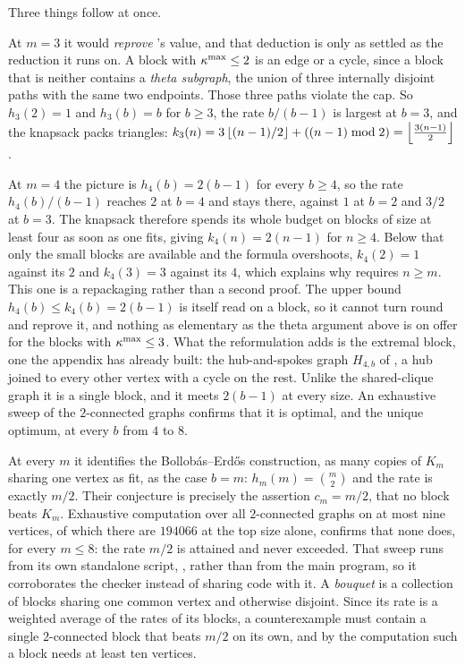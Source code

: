 Three things follow at once.

At $m = 3$ it would \emph{reprove} 's value, and that
deduction is only as settled as the reduction it runs on. A block with
$\kappa^{\max} \le 2$ is an edge or a cycle, since a block that is neither
contains a \emph{theta subgraph}, the union of three internally disjoint paths
with the same two endpoints. Those three paths violate the cap. So
$h_3(2) = 1$ and $h_3(b) = b$ for $b \ge 3$, the rate $b/(b-1)$ is largest at
$b = 3$, and the knapsack packs triangles:
$k_3(n) = 3\left\lfloor (n-1)/2 \right\rfloor + ((n-1) \bmod 2) = \left\lfloor \frac{3(n-1)}{2} \right\rfloor$.

At $m = 4$ the picture is $h_4(b) = 2(b-1)$ for every $b \ge 4$, so the rate $h_4(b)/(b-1)$ reaches $2$ at $b = 4$ and stays there, against $1$ at $b = 2$ and $3/2$ at $b = 3$. The knapsack therefore spends its whole budget on blocks of size at least four as soon as one fits, giving $k_4(n) = 2(n-1)$ for $n \ge 4$. Below that only the small blocks are available and the formula overshoots, $k_4(2) = 1$ against its $2$ and $k_4(3) = 3$ against its $4$, which explains why  requires $n \ge m$. This one is a repackaging rather than a second proof. The upper bound $h_4(b) \le k_4(b) = 2(b-1)$ is  itself read on a block, so it cannot turn round and reprove it, and nothing as elementary as the theta argument above is on offer for the blocks with $\kappa^{\max} \le 3$. What the reformulation adds is the extremal block, one the appendix has already built: the hub-and-spokes graph $H_{4,b}$ of , a hub joined to every other vertex with a cycle on the rest. Unlike the shared-clique graph it is a single block, and it meets $2(b-1)$ at every size. An exhaustive sweep of the $2$-connected graphs confirms that it is optimal, and the unique optimum, at every $b$ from $4$ to $8$.

At every $m$ it identifies the Bollob\'as--Erd\H{o}s construction, as many copies of $K_m$ sharing one vertex as fit, as the case $b = m$: $h_m(m) = \binom{m}{2}$ and the rate is exactly $m/2$. Their conjecture is precisely the assertion $c_m = m/2$, that no block beats $K_m$. Exhaustive computation over all $2$-connected graphs on at most nine vertices, of which there are $194066$ at the top size alone, confirms that none does, for every $m \le 8$: the rate $m/2$ is attained and never exceeded. That sweep runs from its own standalone script, , rather than from the main program, so it corroborates the checker instead of sharing code with it. A \emph{bouquet} is a collection of blocks sharing one common vertex and otherwise disjoint. Since its rate is a weighted average of the rates of its blocks, a counterexample must contain a single $2$-connected block that beats $m/2$ on its own, and by the computation such a block needs at least ten vertices.

